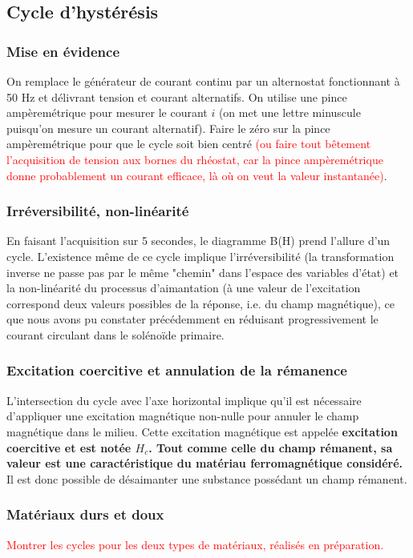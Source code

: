 \documentclass[11pt,a4paper]{report}
\begin{document}
\subsection{Cycle d'hystérésis}

\subsubsection{Mise en évidence}
On remplace le générateur de courant continu par un alternostat fonctionnant à 50 Hz et délivrant tension et courant alternatifs. On utilise une pince ampèremétrique pour mesurer le courant $i$ (on met une lettre minuscule puisqu'on mesure un courant alternatif). Faire le zéro sur la pince ampèremétrique pour que le cycle soit bien centré \textcolor{red}{(ou faire tout bêtement l'acquisition de tension aux bornes du rhéostat, car la pince ampèremétrique donne probablement un courant efficace, là où on veut la valeur instantanée)}.

\subsubsection{Irréversibilité, non-linéarité}
En faisant l'acquisition sur 5 secondes, le diagramme B(H) prend l'allure d'un cycle. L'existence même de ce cycle implique l'irréversibilité (la transformation inverse ne passe pas par le même "chemin" dans l'espace des variables d'état) et la non-linéarité du processus d'aimantation (à une valeur de l'excitation correspond deux valeurs possibles de la réponse, i.e. du champ magnétique), ce que nous avons pu constater précédemment en réduisant progressivement le courant circulant dans le solénoïde primaire.

\subsubsection{Excitation coercitive et annulation de la rémanence}
L'intersection du cycle avec l'axe horizontal implique qu'il est nécessaire d'appliquer une excitation magnétique non-nulle pour annuler le champ magnétique dans le milieu. Cette excitation magnétique est appelée \textbf{excitation coercitive et est notée $H_c$. Tout comme celle du champ rémanent, sa valeur est une caractéristique du matériau ferromagnétique considéré.} Il est donc possible de désaimanter une substance possédant un champ rémanent.

\subsubsection{Matériaux durs et doux}
\textcolor{red}{Montrer les cycles pour les deux types de matériaux, réalisés en préparation.}\\
\end{document}
